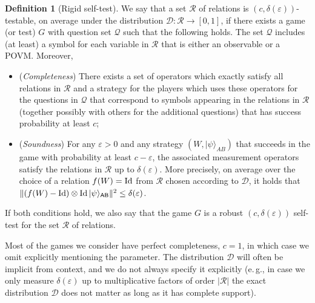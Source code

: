 \documentclass[11pt]{article}
\numberwithin{equation}{section}
\theoremstyle{definition}
\newtheorem{definition}[theorem]{Definition}
\theoremstyle{plain}
\newcommand{\eg}{e.\,g.}
\newcommand{\ket}[1]{|#1\rangle}
\newcommand{\Id}{\ensuremath{\mathop{\rm Id}\nolimits}}
\newcommand{\reg}[1]{{\textsf{#1}}}
\newcommand{\eps}{\varepsilon}
\begin{document}
\begin{definition}[Rigid self-test]
We say that a
%
set $\mathcal{R}$ of relations %
is $(c,\delta(\eps))$-testable, on average under the distribution $\mathcal{D}:\mathcal{R}\to[0,1]$, if
  there exists a game (or test) $G$ with question set $\mathcal{Q}$ such that the following holds. The set $\mathcal{Q}$ includes (at least) a symbol for each variable in $\mathcal{R}$ that is either
  an observable or a POVM. Moreover,
\begin{itemize}
\item (\emph{Completeness}) There exists a set of operators which exactly satisfy all relations in $\mathcal{R}$ and a strategy for the players which uses these operators for the questions in $\mathcal{Q}$ that correspond to symbols appearing in the relations
in  %
$\mathcal{R}$ (together possibly with others for the additional questions) that has success probability at least $c$;
\item (\emph{Soundness}) For any $\eps>0$ and any strategy $(W,\ket{\psi}_{AB})$ that succeeds in the game with probability at least $c-\eps$, the associated measurement operators satisfy the relations in $\mathcal{R}$ up to $\delta(\eps)$. More precisely, on average
 over the choice of a relation $f(W)=\Id$ from $\mathcal{R}$ chosen according to $\mathcal{D}$, it holds that $\|  (f(W)-\Id)\otimes\Id \ket{\psi}_{\reg{AB}}\|^2 \leq \delta(\eps)$.
\end{itemize}
If both conditions hold, we also say that the game $G$ is a robust $(c,\delta(\eps))$ self-test for the %
set $\mathcal{R}$ of relations. %
\end{definition}

Most of the games we consider have perfect completeness, $c=1$, in which case we  omit explicitly mentioning the parameter. 
 The distribution $\mathcal{D}$ will often be implicit from context, and we do not always specify it explicitly (\eg, in case we only measure $\delta(\eps)$ up to multiplicative factors of order $|\mathcal{R}|$ the exact distribution $\mathcal{D}$ does not matter as long as it has complete support). 
\end{document}
